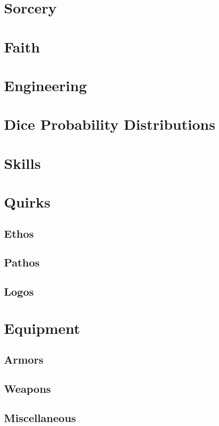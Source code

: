 \documentclass{book}
\begin{document}
    \chapter{Sorcery}

    \chapter{Faith}

    \chapter{Engineering}

    \appendix

    \chapter{Dice Probability Distributions}

    \chapter{Skills}

    \chapter{Quirks}
        \section{Ethos}
        \section{Pathos}
        \section{Logos}

    \chapter{Equipment}
        \section{Armors}
        \section{Weapons}
        \section{Miscellaneous}
\end{document}

